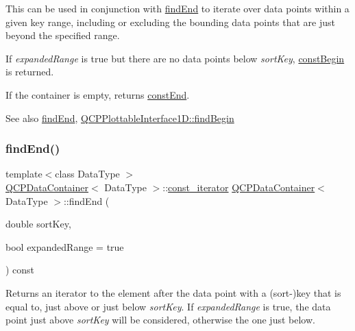 This can be used in conjunction with \hyperlink{class_q_c_p_data_container_afb8b8f23cc2b7234a793a25ce79fe48f}{find\+End} to iterate over data points within a given key range, including or excluding the bounding data points that are just beyond the specified range.

If {\itshape expanded\+Range} is true but there are no data points below {\itshape sort\+Key}, \hyperlink{class_q_c_p_data_container_a49d7622999e2de67fa2331626a3159aa}{const\+Begin} is returned.

If the container is empty, returns \hyperlink{class_q_c_p_data_container_aa7f7cf239b85b1a28de3d675cc5b3da1}{const\+End}.

\begin{DoxySeeAlso}{See also}
\hyperlink{class_q_c_p_data_container_afb8b8f23cc2b7234a793a25ce79fe48f}{find\+End}, \hyperlink{class_q_c_p_plottable_interface1_d_a5b95783271306a4de97be54eac1e7d13}{Q\+C\+P\+Plottable\+Interface1\+D\+::find\+Begin} 
\end{DoxySeeAlso}
\mbox{\label{class_q_c_p_data_container_afb8b8f23cc2b7234a793a25ce79fe48f}} 
\subsubsection{\texorpdfstring{find\+End()}{findEnd()}}
{\footnotesize\ttfamily template$<$class Data\+Type $>$ \\
\hyperlink{class_q_c_p_data_container}{Q\+C\+P\+Data\+Container}$<$ Data\+Type $>$\+::\hyperlink{class_q_c_p_data_container_ae40a91f5cb0bcac61d727427449b7d15}{const\+\_\+iterator} \hyperlink{class_q_c_p_data_container}{Q\+C\+P\+Data\+Container}$<$ Data\+Type $>$\+::find\+End (\begin{DoxyParamCaption}\item[{double}]{sort\+Key,  }\item[{bool}]{expanded\+Range = {\ttfamily true} }\end{DoxyParamCaption}) const}

Returns an iterator to the element after the data point with a (sort-\/)key that is equal to, just above or just below {\itshape sort\+Key}. If {\itshape expanded\+Range} is true, the data point just above {\itshape sort\+Key} will be considered, otherwise the one just below.

